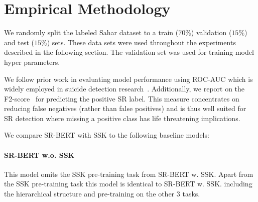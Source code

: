 \documentclass[letterpaper]{article} %
\begin{document}
\section{Empirical Methodology}

We randomly  split   the labeled Sahar dataset  to a train ($70\%$) validation ($15\%$) and test ($15\%$) sets. These data sets were used throughout the experiments described in the following section. The validation set was used for training model hyper parameters.

We follow prior work in evaluating model performance using ROC-AUC which is widely employed in suicide detection research~\cite{bernert2020artificial}. Additionally, we report on the F2-score~\cite{sokolova2006beyond} for predicting the positive SR label. This measure concentrates on reducing false negatives (rather than false positives) and is thus well suited for SR detection where missing a positive class has life threatening implications.




We compare SR-BERT with SSK to the following baseline models:

\paragraph{SR-BERT w.o. SSK} This  model omits the SSK pre-training task from SR-BERT w. SSK. Apart from the SSK pre-training task this model is identical to SR-BERT w. SSK. including the hierarchical structure and pre-training on the other 3 tasks.
\end{document}
